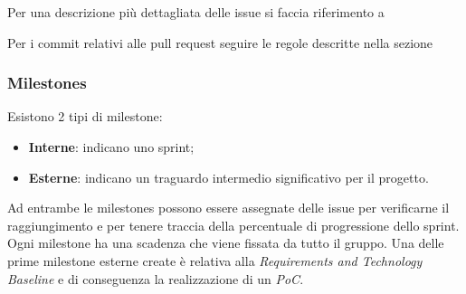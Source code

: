         Per una descrizione più dettagliata delle issue si faccia riferimento a 

        Per i commit relativi alle pull request seguire le regole descritte nella sezione 

        \subsubsection{Milestones}
        Esistono 2 tipi di milestone:
        \begin{itemize}
            \item \textbf{Interne}: indicano uno sprint;
            \item \textbf{Esterne}: indicano un traguardo intermedio significativo per il progetto.
        \end{itemize}
        Ad entrambe le milestones possono essere assegnate delle issue per verificarne il raggiungimento e per tenere traccia
        della percentuale di progressione dello sprint.
        Ogni milestone ha una scadenza che viene fissata da tutto il gruppo. Una delle prime milestone esterne create è
        relativa alla \textit{Requirements and Technology Baseline} e di conseguenza la realizzazione di un \textit{PoC}.


